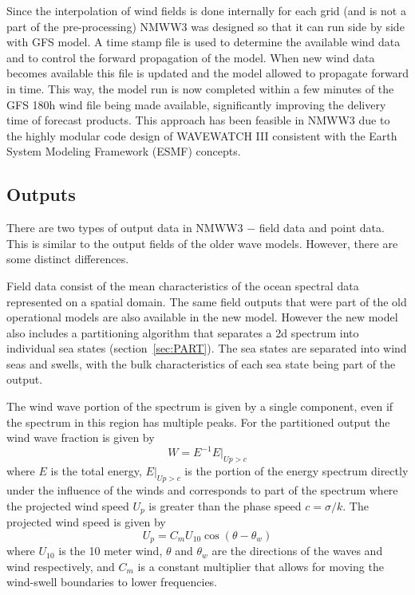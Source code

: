 \documentclass[12pt]{article}
\begin{document}
Since the interpolation of wind fields is done internally for each
grid (and is not a part of the pre-processing) NMWW3 was designed so
that it can run side by side with GFS model. A time stamp file is used
to determine the available wind data and to control the forward
propagation of the model. When new wind data becomes available this
file is updated and the model allowed to propagate forward in
time. This way, the model run is now completed within a few minutes of
the GFS 180h wind file being made available, significantly improving
the delivery time of forecast products. This approach has been
feasible in NMWW3 due to the highly modular code design of WAVEWATCH
III consistent with the Earth System Modeling Framework (ESMF)
concepts.
 
\subsection{Outputs}

There are two types of output data in NMWW3 $-$ field data and point
data. This is similar to the output fields of the older wave
models. However, there are some distinct differences.

Field data consist of the mean characteristics of the ocean spectral
data represented on a spatial domain. The same field outputs that were
part of the old operational models are also available in the new
model. However the new model also includes a partitioning algorithm
that separates a 2d spectrum into individual sea states
(section~\ref{sec:PART}). The sea states are separated into wind seas
and swells, with the bulk characteristics of each sea state being part
of the output.

The wind wave portion of the spectrum is given by a single component,
even if the spectrum in this region has multiple peaks. For the partitioned
output the wind wave fraction is given by
\begin{equation}
W = E^{-1}E|_{Up > c}
\end{equation}
where $E$ is the total energy, $E|_{Up > c}$ is the portion of the
energy spectrum directly under the influence of the winds and
corresponds to part of the spectrum where the projected wind speed
$U_p$ is greater than the phase speed $c=\sigma/k$. The projected wind
speed is given by
\begin{equation}
U_p = C_m U_{10}\cos(\theta-\theta_w)
\end{equation}
where $U_{10}$ is the 10 meter wind, $\theta$ and $\theta_w$ are the
directions of the waves and wind respectively, and $C_m$ is a constant
multiplier that allows for moving the wind-swell boundaries to lower
frequencies.
\end{document}
